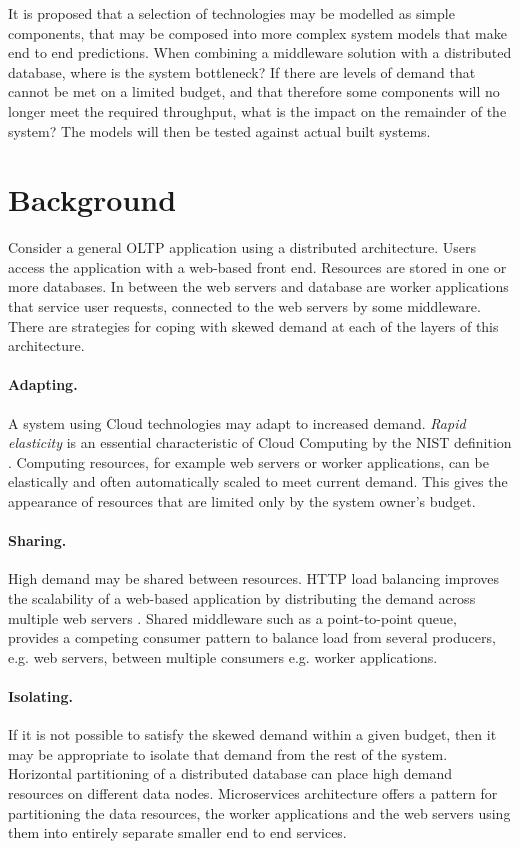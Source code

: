 \documentclass[runningheads]{llncs}
\begin{document}
It is proposed that a selection of technologies may be modelled as simple components, that may be composed into more complex system models that make end to end predictions.  When combining a middleware solution with a distributed database, where is the system bottleneck?  If there are levels of demand that cannot be met on a limited budget, and that therefore some components will no longer meet the required throughput, what is the impact on the remainder of the system?  The models will then be tested against actual built systems.

%
%

\section{Background}\label{sec:background}

Consider a general OLTP application using a distributed architecture.  Users access the application with a web-based front end.  Resources are stored in one or more databases.  In between the web servers and database are worker applications that service user requests, connected to the web servers by some middleware.  There are strategies for coping with skewed demand at each of the layers of this architecture.

\paragraph{Adapting.} A system using Cloud technologies may adapt to increased demand. {\itshape Rapid elasticity} is an essential characteristic of Cloud Computing by the NIST definition \cite{RN56}.  Computing resources, for example web servers or worker applications, can be elastically and often automatically scaled to meet current demand.  This gives the appearance of resources that are limited only by the system owner's budget.

\paragraph{Sharing.} High demand may be shared between resources.  HTTP load balancing improves the scalability of a web-based application by distributing the demand across multiple web servers \cite{RN73}.  Shared middleware such as a point-to-point queue, provides a competing consumer pattern to balance load from several producers, e.g. web servers, between multiple consumers e.g. worker applications.

\paragraph{Isolating.} If it is not possible to satisfy the skewed demand within a given budget, then it may be appropriate to isolate that demand from the rest of the system.  Horizontal partitioning of a distributed database can place high demand resources on different data nodes.  Microservices architecture offers a pattern for partitioning the data resources, the worker applications and the web servers using them into entirely separate smaller end to end services.
\end{document}
